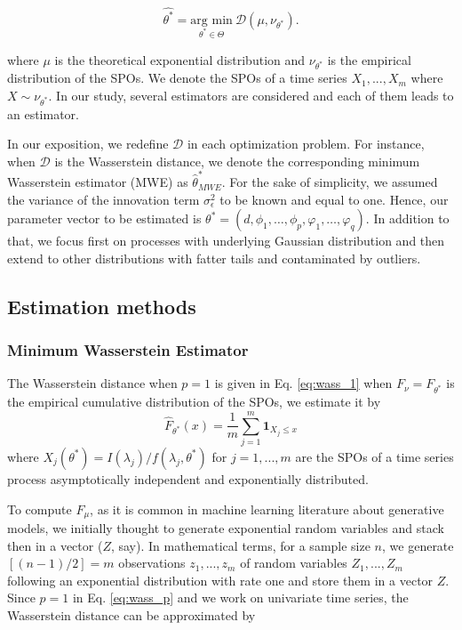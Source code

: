 \documentclass[
  11pt,
]{article}
\begin{document}
\[\hat{\theta^*}=\underset{\theta^* \in \Theta}{\text{arg min}} \ \mathcal{D}\left({\mu}, \nu_{\theta^*}\right) .\]

where \(\mu\) is the theoretical exponential distribution and
\(\nu_{\theta^*}\) is the empirical distribution of the SPOs. We denote
the SPOs of a time series \(X_1, ..., X_m\) where
\(X \sim \nu_{\theta^*}\). In our study, several estimators are
considered and each of them leads to an estimator.

In our exposition, we redefine \(\mathcal{D}\) in each optimization
problem. For instance, when \(\mathcal{D}\) is the Wasserstein distance,
we denote the corresponding minimum Wasserstein estimator (MWE) as
\(\hat \theta^*_{MWE}\). For the sake of simplicity, we assumed the
variance of the innovation term \(\sigma^2_\epsilon\) to be known and
equal to one. Hence, our parameter vector to be estimated is
\(\theta^* = (d, \phi_{1}, \ldots, \phi_{p}, \varphi_{1}, \ldots, \varphi_{q}).\)
In addition to that, we focus first on processes with underlying
Gaussian distribution and then extend to other distributions with fatter
tails and contaminated by outliers.

\hypertarget{estimation-methods}{%
\subsection{Estimation methods}\label{estimation-methods}}

\hypertarget{minimum-wasserstein-estimator}{%
\subsubsection{Minimum Wasserstein
Estimator}\label{minimum-wasserstein-estimator}}

The Wasserstein distance when \(p=1\) is given in Eq. \ref{eq:wass_1}
when \(F_{\nu} = F_{\theta^*}\) is the empirical cumulative distribution
of the SPOs, we estimate it by \[
\hat{F}_{\theta^*}(x)=\frac{1}{m} \sum_{j=1}^{m} \mathbf{1}_{X_{j} \leq x}
\] where
\(X_j(\theta^*) = I(\lambda_j) / f\left(\lambda_{j}, \theta^*\right)\)
for \(j = 1, ..., m\) are the SPOs of a time series process
asymptotically independent and exponentially distributed.

To compute \(F_\mu\), as it is common in machine learning literature
about generative models, we initially thought to generate exponential
random variables and stack then in a vector (\(Z\), say). In
mathematical terms, for a sample size \(n\), we generate
\([(n-1)/2] = m\) observations \(z_1, ..., z_m\) of random variables
\(Z_1, ..., Z_m\) following an exponential distribution with rate one
and store them in a vector \(Z\). Since \(p = 1\) in Eq. \ref{eq:wass_p}
and we work on univariate time series, the Wasserstein distance can be
approximated by
\end{document}

